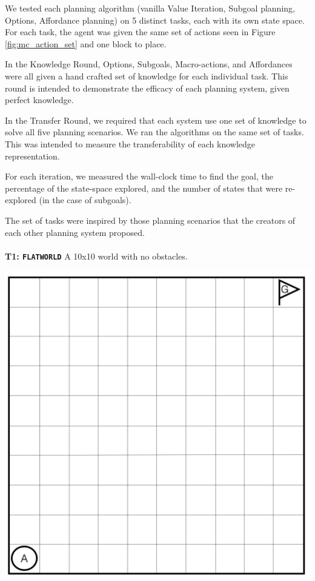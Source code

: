 \documentclass[]{article}
\begin{document}
We tested each planning algorithm (vanilla Value Iteration, Subgoal planning, Options, Affordance planning) on 5 distinct tasks, each with its own state space. For each task, the agent was given the same set of actions seen in Figure \ref{fig:mc_action_set} and one block to place.

In the Knowledge Round, Options, Subgoals, Macro-actions, and Affordances were all given a hand crafted set of knowledge for each individual task. This round is intended to demonstrate the efficacy of each planning system, given perfect knowledge.

In the Transfer Round, we required that each system use one set of knowledge to solve all five planning scenarios. We ran the algorithms on the same set of tasks. This was intended to measure the transferability of each knowledge representation.

For each iteration, we measured the wall-clock time to find the goal, the percentage of the state-space explored, and the number of states that were re-explored (in the case of subgoals).

The set of tasks were inspired by those planning scenarios that the creators of each other planning system proposed. \\ \\

{\bf T1: \texttt{FLATWORLD}} A 10x10 world with no obstacles.

\begin{center}
\includegraphics[scale=0.24]{figures/flatland.png}

\end{center}
\end{document}
